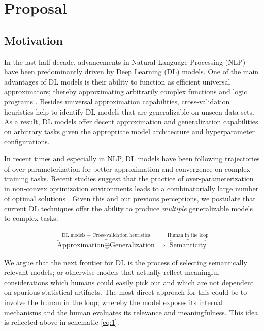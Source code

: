 \section{Proposal}

\subsection{Motivation}

In the last half decade, advancements in Natural Language Processing (NLP) have been predominantly driven by Deep Learning (DL) models. One of the main advantages of DL models is their ability to function as efficient universal approximators; thereby approximating arbitrarily complex functions and logic programs \citep{cybenko1989approximation, hornik1989multilayer, kepner2018sparse}. Besides universal approximation capabilities, cross-validation heuristics help to identify DL models that are generalizable on unseen data sets. As a result, DL models offer decent approximation and generalization capabilities on arbitrary tasks given the appropriate model architecture and hyperparameter configurations.

In recent times and especially in NLP, DL models have been following trajectories of over-parameterization for better approximation and convergence on complex training tasks. Recent studies suggest that the practice of over-parameterization in non-convex optimization environments leads to a combinatorially large number of optimal solutions \citep{kepner2018sparse}. Given this and our previous perceptions, we postulate that current DL techniques offer the ability to produce \textit{multiple} generalizable models to complex tasks. 

\begin{gather}
  \label{eq:1}
  \overbrace{\text{Approximation} \oplus \text{Generalization}}^{\text{DL models + Cross-validation heuristics}} \Rightarrow \overbrace{\text{Semanticity}}^{\text{Human in the loop}}
\end{gather}

We argue that the next frontier for DL is the process of selecting semantically relevant models; or otherwise models that actually reflect meaningful considerations which humans could easily pick out and which are not dependent on spurious statistical artifacts. The most direct approach for this could be to involve the human in the loop; whereby the model exposes its internal mechanisms and the human evaluates its relevance and meaningfulness. This idea is reflected above in schematic \ref{eq:1}.

